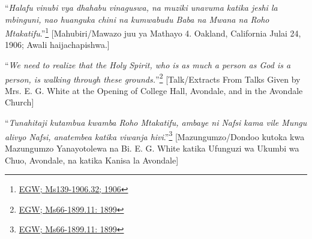 “\textit{Halafu vinubi vya dhahabu vinaguswa, na muziki unavuma katika jeshi la mbinguni, nao huanguka chini na kumwabudu Baba na Mwana na Roho Mtakatifu}.”\footnote{\href{https://egwwritings.org/?ref=en_Ms139-1906.32&para=9579.38}{EGW; Ms139-1906.32; 1906}} [Mahubiri/Mawazo juu ya Mathayo 4. Oakland, California Julai 24, 1906; Awali haijachapishwa.]


“\textit{We need to realize that the Holy Spirit, who is as much a person as God is a person, is walking through these grounds.}”\footnote{\href{https://egwwritings.org/?ref=en_Ms66-1899.11&para=6622.19}{EGW; Ms66-1899.11: 1899}} [Talk/Extracts From Talks Given by Mrs. E. G. White at the Opening of College Hall, Avondale, and in the Avondale Church]


“\textit{Tunahitaji kutambua kwamba Roho Mtakatifu, ambaye ni Nafsi kama vile Mungu alivyo Nafsi, anatembea katika viwanja hivi}.”\footnote{\href{https://egwwritings.org/?ref=en_Ms66-1899.11&para=6622.19}{EGW; Ms66-1899.11: 1899}} [Mazungumzo/Dondoo kutoka kwa Mazungumzo Yanayotolewa na Bi. E. G. White katika Ufunguzi wa Ukumbi wa Chuo, Avondale, na katika Kanisa la Avondale]
